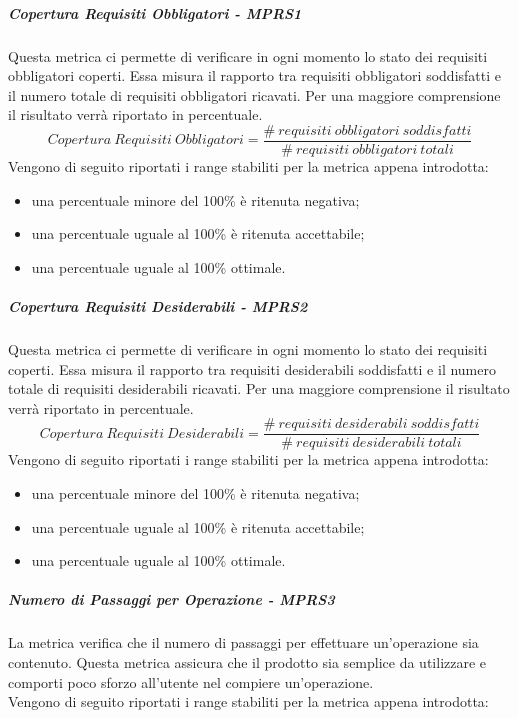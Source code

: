 \documentclass[../PianoDiQualifica.tex]{subfiles}
\begin{document}
			\subparagraph{Copertura Requisiti Obbligatori - MPRS1}\label{MPRS1}
			Questa metrica ci permette di verificare in ogni momento lo stato dei requisiti obbligatori coperti. Essa misura il rapporto tra requisiti obbligatori soddisfatti e il numero totale di requisiti obbligatori ricavati. Per una maggiore comprensione il risultato verrà riportato in percentuale.
			\begin{equation}
				Copertura \ Requisiti \ Obbligatori = \frac{\#\ requisiti\ obbligatori\ soddisfatti }{\#\ requisiti\ obbligatori\ totali}
			\end{equation}
			Vengono di seguito riportati i range stabiliti per la metrica appena introdotta:
			\begin{itemize}
				\item una percentuale minore del 100\% è ritenuta negativa;
				\item una percentuale uguale al 100\% è ritenuta accettabile;
				\item una percentuale uguale al 100\% ottimale.
			\end{itemize}
			\subparagraph{Copertura Requisiti Desiderabili - MPRS2}\label{MPRS2}
			Questa metrica ci permette di verificare in ogni momento lo stato dei requisiti coperti. Essa misura il rapporto tra requisiti desiderabili soddisfatti e il numero totale di requisiti desiderabili ricavati. Per una maggiore comprensione il risultato verrà riportato in percentuale.
			\begin{equation}
			Copertura \ Requisiti \ Desiderabili = \frac{\#\ requisiti\ desiderabili\ soddisfatti }{\#\ requisiti\ desiderabili\ totali}
			\end{equation}
			Vengono di seguito riportati i range stabiliti per la metrica appena introdotta:
			\begin{itemize}
				\item una percentuale minore del 100\% è ritenuta negativa;
				\item una percentuale uguale al 100\% è ritenuta accettabile;
				\item una percentuale uguale al 100\% ottimale.
			\end{itemize}
			\subparagraph{Numero di Passaggi per Operazione - MPRS3}\label{MPRS3}
			La metrica verifica che il numero di passaggi per effettuare un'operazione sia contenuto. Questa metrica assicura che il prodotto sia semplice da utilizzare e comporti poco sforzo all'utente nel compiere un'operazione.\\
			Vengono di seguito riportati i range stabiliti per la metrica appena introdotta:
\end{document}
